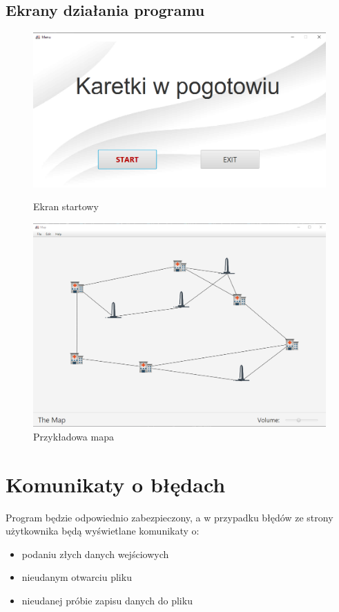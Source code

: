 \documentclass{article}
\begin{document}
\subsection{Ekrany działania programu}
{\fontsize{14}{14}\selectfont 
\begin{figure}[!h]
    \centering
    \includegraphics[width=1\textwidth]{images/ekran_startowy.png}
    \caption{Ekran startowy}
    
    \vspace*{\floatsep}
    
    \includegraphics[width=1\textwidth]{images/przykladowa_mapa.png}
    \caption{Przykładowa mapa}
\end{figure}

\newline}

\section{Komunikaty o błędach}
{\fontsize{14}{14}\selectfont 
Program będzie odpowiednio zabezpieczony, a w przypadku błędów ze strony użytkownika będą wyświetlane komunikaty o:
\begin{itemize}
\item podaniu złych danych wejściowych
\item  nieudanym otwarciu pliku
\item  nieudanej próbie zapisu danych do pliku
\newline
\newline
\end{itemize}

}
\end{document}
